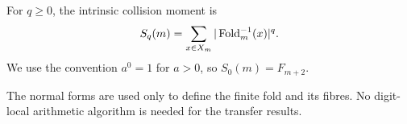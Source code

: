\begin{definition}
\label{def:collision-moment}
For \(q\ge0\), the intrinsic collision moment is
\[
 S_q(m)=\sum_{x\in X_m}|\operatorname{Fold}_m^{-1}(x)|^q .
\]
We use the convention \(a^0=1\) for \(a>0\), so
\(S_0(m)=F_{m+2}\).
\end{definition}

\begin{remark}
The normal forms are used only to define the finite fold and its fibres.  No
digit-local arithmetic algorithm is needed for the transfer results.
\end{remark}


